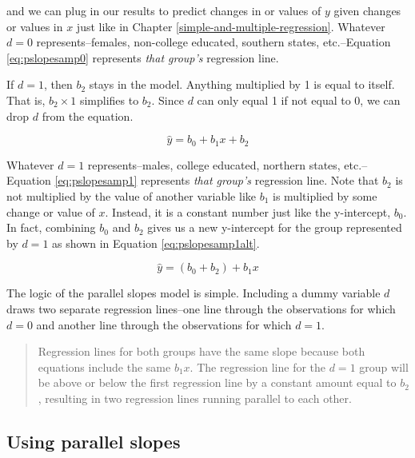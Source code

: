 \documentclass[
]{book}
\begin{document}
and we can plug in our results to predict changes in or values of \(y\) given changes or values in \(x\) just like in Chapter \ref{simple-and-multiple-regression}. Whatever \(d=0\) represents--females, non-college educated, southern states, etc.--Equation \eqref{eq:pslopesamp0} represents \emph{that group's} regression line.

If \(d=1\), then \(b_2\) stays in the model. Anything multiplied by 1 is equal to itself. That is, \(b_2 \times 1\) simplifies to \(b_2\). Since \(d\) can only equal 1 if not equal to 0, we can drop \(d\) from the equation.

\begin{equation}
\hat{y} = b_0 + b_1x + b_2
\label{eq:pslopesamp1}
\end{equation}

Whatever \(d=1\) represents--males, college educated, northern states, etc.--Equation \eqref{eq:pslopesamp1} represents \emph{that group's} regression line. Note that \(b_2\) is not multiplied by the value of another variable like \(b_1\) is multiplied by some change or value of \(x\). Instead, it is a constant number just like the y-intercept, \(b_0\). In fact, combining \(b_0\) and \(b_2\) gives us a new y-intercept for the group represented by \(d=1\) as shown in Equation \eqref{eq:pslopesamp1alt}.

\begin{equation}
\hat{y} = (b_0 + b_2) + b_1x
\label{eq:pslopesamp1alt}
\end{equation}

The logic of the parallel slopes model is simple. Including a dummy variable \(d\) draws two separate regression lines--one line through the observations for which \(d=0\) and another line through the observations for which \(d=1\).

\begin{quote}
Regression lines for both groups have the same slope because both equations include the same \(b_1x\). The regression line for the \(d=1\) group will be above or below the first regression line by a constant amount equal to \(b_2\), resulting in two regression lines running parallel to each other.
\end{quote}

\hypertarget{using-parallel-slopes}{%
\subsection{Using parallel slopes}\label{using-parallel-slopes}}
\end{document}
